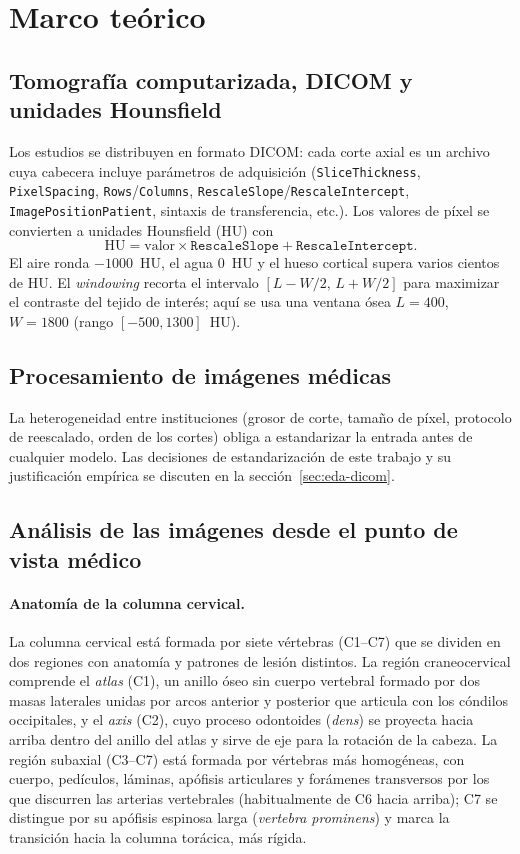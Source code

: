 \section{Marco te\'orico}
\subsection{Tomograf\'ia computarizada, DICOM y unidades Hounsfield}
Los estudios se distribuyen en formato DICOM: cada corte axial es un archivo cuya cabecera incluye par\'ametros de adquisici\'on (\texttt{SliceThickness}, \texttt{PixelSpacing}, \texttt{Rows}/\texttt{Columns}, \texttt{RescaleSlope}/\texttt{RescaleIntercept}, \texttt{ImagePositionPatient}, sintaxis de transferencia, etc.). Los valores de p\'ixel se convierten a unidades Hounsfield (HU) con
\[
\mathrm{HU} = \text{valor}\times\texttt{RescaleSlope}+\texttt{RescaleIntercept}.
\]
El aire ronda $-1000$~HU, el agua 0~HU y el hueso cortical supera varios cientos de HU. El \emph{windowing} recorta el intervalo $[L-W/2,\,L+W/2]$ para maximizar el contraste del tejido de inter\'es; aqu\'i se usa una ventana \'osea $L=400$, $W=1800$ (rango $[-500,1300]$~HU).

\subsection{Procesamiento de im\'agenes m\'edicas}
La heterogeneidad entre instituciones (grosor de corte, tama\~no de p\'ixel, protocolo de reescalado, orden de los cortes) obliga a estandarizar la entrada antes de cualquier modelo. Las decisiones de estandarizaci\'on de este trabajo y su justificaci\'on emp\'irica se discuten en la secci\'on~\ref{sec:eda-dicom}.

\subsection{An\'alisis de las im\'agenes desde el punto de vista m\'edico}
\paragraph{Anatom\'ia de la columna cervical.} La columna cervical est\'a formada por siete v\'ertebras (C1--C7) que se dividen en dos regiones con anatom\'ia y patrones de lesi\'on distintos. La regi\'on craneocervical comprende el \emph{atlas} (C1), un anillo \'oseo sin cuerpo vertebral formado por dos masas laterales unidas por arcos anterior y posterior que articula con los c\'ondilos occipitales, y el \emph{axis} (C2), cuyo proceso odontoides (\emph{dens}) se proyecta hacia arriba dentro del anillo del atlas y sirve de eje para la rotaci\'on de la cabeza. La regi\'on subaxial (C3--C7) est\'a formada por v\'ertebras m\'as homog\'eneas, con cuerpo, ped\'iculos, l\'aminas, ap\'ofisis articulares y for\'amenes transversos por los que discurren las arterias vertebrales (habitualmente de C6 hacia arriba); C7 se distingue por su ap\'ofisis espinosa larga (\emph{vertebra prominens}) y marca la transici\'on hacia la columna tor\'acica, m\'as r\'igida.

